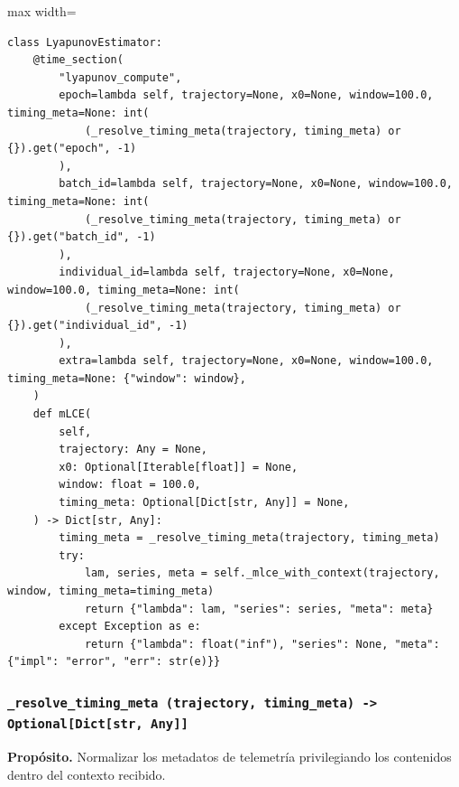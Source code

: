 \begin{listing}[H]
\caption{Bloque de código de \texttt{mLCE}}
\begin{adjustbox}{max width=\textwidth}
\begin{minipage}{\textwidth}
\begin{verbatim}
class LyapunovEstimator:
    @time_section(
        "lyapunov_compute",
        epoch=lambda self, trajectory=None, x0=None, window=100.0, timing_meta=None: int(
            (_resolve_timing_meta(trajectory, timing_meta) or {}).get("epoch", -1)
        ),
        batch_id=lambda self, trajectory=None, x0=None, window=100.0, timing_meta=None: int(
            (_resolve_timing_meta(trajectory, timing_meta) or {}).get("batch_id", -1)
        ),
        individual_id=lambda self, trajectory=None, x0=None, window=100.0, timing_meta=None: int(
            (_resolve_timing_meta(trajectory, timing_meta) or {}).get("individual_id", -1)
        ),
        extra=lambda self, trajectory=None, x0=None, window=100.0, timing_meta=None: {"window": window},
    )
    def mLCE(
        self,
        trajectory: Any = None,
        x0: Optional[Iterable[float]] = None,
        window: float = 100.0,
        timing_meta: Optional[Dict[str, Any]] = None,
    ) -> Dict[str, Any]:
        timing_meta = _resolve_timing_meta(trajectory, timing_meta)
        try:
            lam, series, meta = self._mlce_with_context(trajectory, window, timing_meta=timing_meta)
            return {"lambda": lam, "series": series, "meta": meta}
        except Exception as e:
            return {"lambda": float("inf"), "series": None, "meta": {"impl": "error", "err": str(e)}}
\end{verbatim}
\end{minipage}
\end{adjustbox}
\end{listing}
\vspace{0.2cm}

\subsubsection*{\texttt{\_resolve\_timing\_meta~(trajectory, timing\_meta) -> Optional[Dict[str, Any]]}}
\vfill
\textbf{Propósito.} Normalizar los metadatos de telemetría privilegiando los contenidos dentro del contexto recibido.\\


